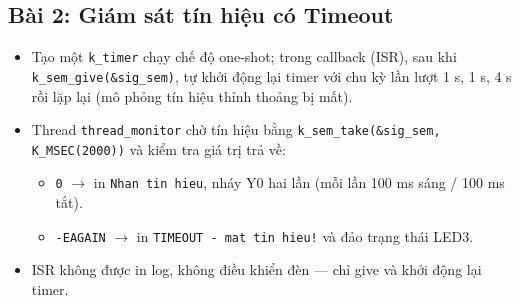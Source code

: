 \newpage
\subsection{Bài 2: Giám sát tín hiệu có Timeout}

\begin{tcolorbox}[
    enhanced, colback=black!2, colframe=black!60, boxrule=1pt, arc=2.5mm, drop shadow,
    attach boxed title to top left={xshift=4mm, yshift=-3mm},
    boxed title style={enhanced, colback=black!85, colframe=black!85, boxrule=1pt, arc=2.5mm, drop shadow, left=6pt, right=6pt, top=2pt, bottom=2pt},
    title=\textcolor{white}{\large\textbf{Yêu cầu đề bài (Trích phiếu bài tập)}}
]
\bfseries
\vspace{0.2cm}
\begin{itemize}
    \item Tạo một \texttt{k\_timer} chạy chế độ one-shot; trong callback (ISR), sau khi \texttt{k\_sem\_give(\&sig\_sem)}, tự khởi động lại timer với chu kỳ lần lượt 1 s, 1 s, 4 s rồi lặp lại (mô phỏng tín hiệu thỉnh thoảng bị mất).
    \item Thread \texttt{thread\_monitor} chờ tín hiệu bằng \texttt{k\_sem\_take(\&sig\_sem, K\_MSEC(2000))} và kiểm tra giá trị trả về:
    \begin{itemize}
        \item \texttt{0} $\rightarrow$ in \texttt{Nhan tin hieu}, nháy Y0 hai lần (mỗi lần 100 ms sáng / 100 ms tắt).
        \item \texttt{-EAGAIN} $\rightarrow$ in \texttt{TIMEOUT - mat tin hieu!} và đảo trạng thái LED3.
    \end{itemize}
    \item ISR không được in log, không điều khiển đèn — chỉ give và khởi động lại timer.
\end{itemize}
\end{tcolorbox}

\vspace{0.3cm}
